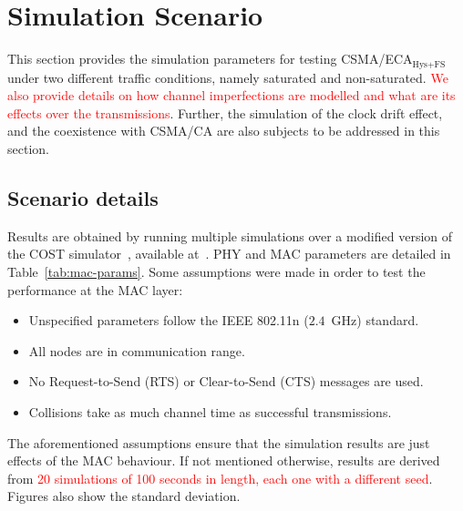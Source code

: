 \section{Simulation Scenario}\label{simulations}
This section provides the simulation parameters for testing CSMA/ECA$_{\text{Hys+FS}}$ under two different traffic conditions, namely saturated and non-saturated. \textcolor{red}{We also provide details on how channel imperfections are modelled and what are its effects over the transmissions}. Further, the simulation of the clock drift effect, and the coexistence with CSMA/CA are also subjects to be addressed in this section.

	\subsection{Scenario details}
	Results are obtained by running multiple simulations over a modified version of the COST simulator~\cite{COST}, available at~\cite{sim:parameters}. PHY and MAC parameters are detailed in Table~\ref{tab:mac-params}. Some assumptions were made in order to test the performance at the MAC layer:
	
	\begin{itemize}
		\item Unspecified parameters follow the IEEE 802.11n ($2.4$~GHz) standard.
		\item All nodes are in communication range.
		\item No Request-to-Send (RTS) or Clear-to-Send (CTS) messages are used.
		\item Collisions take as much channel time as successful transmissions.
	\end{itemize}
	
	The aforementioned assumptions ensure that the simulation results are just effects of the MAC behaviour.
	If not mentioned otherwise, results are derived from \textcolor{red}{20 simulations of 100 seconds in length, each one with a different seed}. Figures also show the standard deviation.
	
